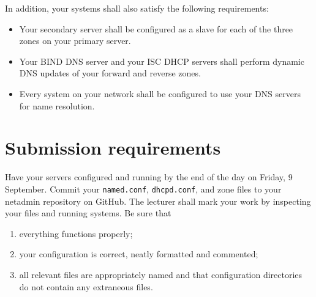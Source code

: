 \documentclass{article}
\begin{document}
In addition, your systems shall also satisfy the following requirements:

\begin{itemize}
	
    \item Your secondary server shall be configured as a slave for each of the three zones on your primary server.

    \item Your BIND DNS server and your ISC DHCP servers shall perform dynamic DNS updates of your forward and reverse zones.

    \item Every system on your network shall be configured to use your DNS servers for name resolution.
\end{itemize}

\section{Submission requirements}
Have your servers configured and running by the end of the day on Friday, 9 September.  Commit your \texttt{named.conf}, \texttt{dhcpd.conf}, and zone files to your netadmin repository on GitHub. The lecturer shall mark your work by inspecting your files and running systems. Be sure that 
  \begin{enumerate}
    \item everything functions properly;
    \item your configuration is correct, neatly formatted and commented;
    \item all relevant files are appropriately named and that configuration 
          directories do not contain any extraneous files.
  \end{enumerate}
\end{document}
